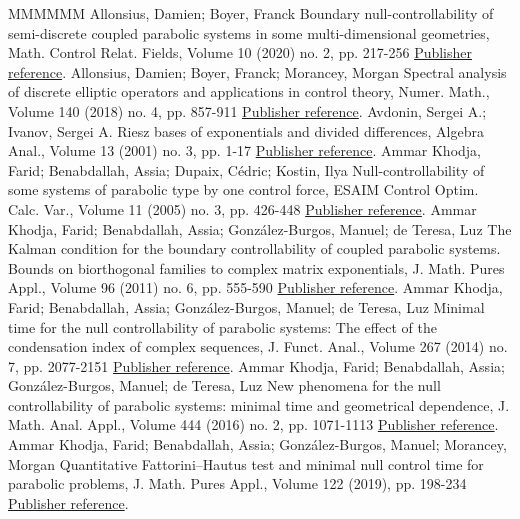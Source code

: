 \begin{thebibliography}{MMMMMM}
 Allonsius, Damien; Boyer, Franck Boundary null-controllability of semi-discrete coupled parabolic systems in some multi-dimensional geometries, Math. Control Relat. Fields, Volume 10 (2020) no. 2, pp. 217-256 \href{https://ahl.centre-mersenne.org/item/AHL_2020__3__717_0/#AB18}{Publisher reference}.
 Allonsius, Damien; Boyer, Franck; Morancey, Morgan Spectral analysis of discrete elliptic operators and applications in control theory, Numer. Math., Volume 140 (2018) no. 4, pp. 857-911 \href{https://ahl.centre-mersenne.org/item/AHL_2020__3__717_0/#ABM_2018}{Publisher reference}.
 Avdonin, Sergei A.; Ivanov, Sergei A. Riesz bases of exponentials and divided differences, Algebra Anal., Volume 13 (2001) no. 3, pp. 1-17 \href{https://ahl.centre-mersenne.org/item/AHL_2020__3__717_0/#AvdoninIvanov01}{Publisher reference}.
 Ammar Khodja, Farid; Benabdallah, Assia; Dupaix, Cédric; Kostin, Ilya Null-controllability of some systems of parabolic type by one control force, ESAIM Control Optim. Calc. Var., Volume 11 (2005) no. 3, pp. 426-448 \href{https://ahl.centre-mersenne.org/item/AHL_2020__3__717_0/#AKBDK05}{Publisher reference}.
 Ammar Khodja, Farid; Benabdallah, Assia; González-Burgos, Manuel; de Teresa, Luz The Kalman condition for the boundary controllability of coupled parabolic systems. Bounds on biorthogonal families to complex matrix exponentials, J. Math. Pures Appl., Volume 96 (2011) no. 6, pp. 555-590 \href{https://ahl.centre-mersenne.org/item/AHL_2020__3__717_0/#AKBGBDT_Kalman}{Publisher reference}.
 Ammar Khodja, Farid; Benabdallah, Assia; González-Burgos, Manuel; de Teresa, Luz Minimal time for the null controllability of parabolic systems: The effect of the condensation index of complex sequences, J. Funct. Anal., Volume 267 (2014) no. 7, pp. 2077-2151 \href{https://ahl.centre-mersenne.org/item/AHL_2020__3__717_0/#AmmarKhodjaBenabdallahGonzalez-BurgosdeTeresa:2014}{Publisher reference}.
 Ammar Khodja, Farid; Benabdallah, Assia; González-Burgos, Manuel; de Teresa, Luz New phenomena for the null controllability of parabolic systems: minimal time and geometrical dependence, J. Math. Anal. Appl., Volume 444 (2016) no. 2, pp. 1071-1113 \href{https://ahl.centre-mersenne.org/item/AHL_2020__3__717_0/#AKBGBdT_JMAA16}{Publisher reference}.
 Ammar Khodja, Farid; Benabdallah, Assia; González-Burgos, Manuel; Morancey, Morgan Quantitative Fattorini–Hautus test and minimal null control time for parabolic problems, J. Math. Pures Appl., Volume 122 (2019), pp. 198-234 \href{https://ahl.centre-mersenne.org/item/AHL_2020__3__717_0/#AKBGBM_2018}{Publisher reference}.

\end{thebibliography}
